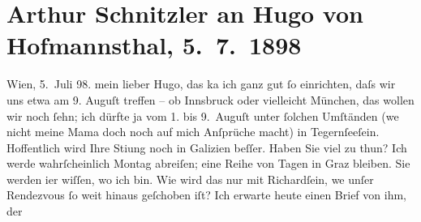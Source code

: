 

         
         \renewcommand{\erwaehntePersonen}{Personen: Richard Beer-Hofmann, Hugo von Hofmannsthal, Louise Schnitzler}
         \renewcommand{\erwaehnteOrte}{Orte: Galizien, Graz, Innsbruck, München, Tegernsee, Tschortkiw, Wien}
         \renewcommand{\erwaehnteWerke}{Werke: Der Schleier der Beatrice. Schauspiel in fünf Akten}
               \section[Arthur Schnitzler an Hugo von Hofmannsthal, 5. 7. 1898]{ Arthur Schnitzler an Hugo von Hofmannsthal, 5. 7. 1898}\nopagebreak{}\rehead{ }\begin{ledgroupsized}[t]{13cm}\normalsize\beginnumbering \toendnotes[C]{\smallbreak\pagebreak[2]} 
\toendnotes[C]{\smallbreak}\pstart
           \raggedleft{}{\pb}Wien, 5. Juli 98.\pend
           \pstart
           mein lieber Hugo, das ka{\geminationn} ich ganz gut
               ſo einrichten, daſs wir uns etwa am 9. Auguſt treffen – ob Innsbruck oder vielleicht München, das wollen wir noch ſehn; ich dürfte ja vom
                  1. bis 9. Auguſt unter ſolchen Umſtänden (we{\geminationn} nicht meine Mama doch noch auf mich Anſprüche macht) in Tegernſeeſein. Hoffentlich wird Ihre Sti{\geminationm}ung {\pb}noch in Galizien beſſer. Haben Sie viel zu thun?\pend
           \pstart
           Ich werde wahrſcheinlich Montag abreiſen; eine Reihe von Tagen in Graz bleiben. Sie werden i{\geminationm}er wiſſen, wo ich bin. Wie wird das nur mit Richardſein, we{\geminationn} unſer
               Rendezvous ſo weit hinaus geſchoben iſt? Ich erwarte heute einen Brief von ihm, der

\end{ledgroupsized}
